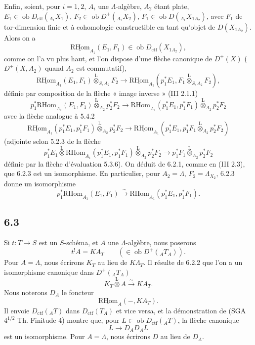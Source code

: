 \documentclass[11pt]{article}
\providecommand{\RHom}{\mathrm{RHom}}
\providecommand{\uRHom}{\underline{\RHom}}
\providecommand{\lten}{\overset{\mathrm L}{\otimes}}
\providecommand{\Ob}{\operatorname{ob}}
\providecommand{\RHom}{\mathrm{RHom}}
\providecommand{\lten}{\overset{\mathrm L}{\otimes}}
\providecommand{\RHom}{\mathrm R\mathcal{H}om}
\providecommand{\lten}{\overset{\mathrm L}{\otimes}}
\providecommand{\Ob}{\operatorname{ob}}
\providecommand{\lten}{\overset{\mathrm L}{\otimes}}
\providecommand{\lten}{\overset{\mathrm L}{\otimes}}
\providecommand{\Ob}{\operatorname{Ob}}
\providecommand{\lten}{\overset{\mathrm L}{\otimes}}
\providecommand{\RHom}{\mathrm{RHom}}
\providecommand{\Ob}{\operatorname{ob}}
\providecommand{\Ob}{\operatorname{Ob}}
\providecommand{\lten}{\overset{\mathrm L}{\otimes}}
\begin{document}
Enfin, soient, pour $i=1,2$, $A_i$ une $\Lambda$-algèbre, $A_2$ étant plate, $E_1\in\Ob D_{\mathrm{ctf}}({}_{A_1}X_1)$, $F_2\in\Ob D^+({}_{A_2}X_2)$, $F_1\in\Ob D({}_{A_1}X_{1A_2})$, avec $F_1$ de tor-dimension finie et à cohomologie constructible en tant qu'objet de $D(X_{1A_2})$. Alors on a
\[
\uRHom_{A_1}(E_1,F_1)\in\Ob D_{\mathrm{ctf}}(X_{1A_2}),
\]
comme on l'a vu plus haut, et l'on dispose d'une flèche canonique de $D^+(X)$ ($D^+(X,A_2)$ quand $A_2$ est commutatif),
\begin{equation}
\uRHom_{A_1}(E_1,F_1)\lten_{S,A_2}F_2
\longrightarrow
\uRHom_{A_1}(p_1^*E_1,F_1\lten_{S,A_2}F_2),
\tag{6.2.3}
\end{equation}
définie par composition de la flèche « image inverse » (III 2.1.1)
\[
p_1^*\uRHom_{A_1}(E_1,F_1)\lten_{A_2}p_2^*F_2
\longrightarrow
\uRHom_{A_1}(p_1^*E_1,p_1^*F_1)\lten_{A_2}p_2^*F_2
\]
avec la flèche analogue à 5.4.2
\[
\uRHom_{A_1}(p_1^*E_1,p_1^*F_1)\lten_{A_2}p_2^*F_2
\longrightarrow
\uRHom_{A_1}(p_1^*E_1,p_1^*F_1\lten_{A_2}p_2^*F_2)
\]
(adjointe selon 5.2.3 de la flèche
\[
p_1^*E_1\lten\uRHom_{A_1}(p_1^*E_1,p_1^*F_1)\lten_{A_2}p_2^*F_2
\longrightarrow
p_1^*F_1\lten_{A_2}p_2^*F_2
\]
définie par la flèche d'évaluation 5.3.6). On déduit de 6.2.1, comme en (III 2.3), que 6.2.3 est un isomorphisme. En particulier, pour $A_2=\Lambda$, $F_2=\Lambda_{X_2}$, 6.2.3 donne un isomorphisme
\begin{equation}
p_1^*\uRHom_{A_1}(E_1,F_1)
\xrightarrow{\sim}
\uRHom_{A_1}(p_1^*E_1,p_1^*F_1).
\tag{6.2.4}
\end{equation}

\subsection*{6.3}
Si $t:T\to S$ est un $S$-schéma, et $A$ une $\Lambda$-algèbre, nous poserons
\begin{equation}
t^!A = KA_T \qquad(\in\Ob D^+({}_AT_A)).
\tag{6.3.1}
\end{equation}
Pour $A=\Lambda$, nous écrirons $K_T$ au lieu de $K\Lambda_T$. Il résulte de 6.2.2 que l'on a un isomorphisme canonique dans $D^+({}_AT_A)$
\begin{equation}
K_T\lten A\xrightarrow{\sim}KA_T.
\tag{6.3.2}
\end{equation}
Nous noterons $D_A$ le foncteur
\[
\uRHom_A(-,KA_T).
\]
Il envoie $D_{\mathrm{ctf}}({}_AT)$ dans $D_{\mathrm{ctf}}(T_A)$ et vice versa, et la démonstration de (SGA $4^{1/2}$ Th. Finitude 4) montre que, pour $L\in\Ob D_{\mathrm{ctf}}({}_AT)$, la flèche canonique
\[
L\longrightarrow D_AD_AL
\]
est un isomorphisme. Pour $A=\Lambda$, nous écrirons $D$ au lieu de $D_A$.
\end{document}
